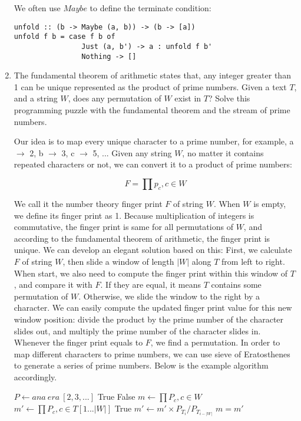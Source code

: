 \documentclass[UTF8]{article}
\begin{document}
\begin{enumerate}
We often use $Maybe$ to define the terminate condition:

\begin{lstlisting}
unfold :: (b -> Maybe (a, b)) -> (b -> [a])
unfold f b = case f b of
                Just (a, b') -> a : unfold f b'
                Nothing -> []
\end{lstlisting}

\item{The fundamental theorem of arithmetic states that, any integer greater than 1 can be unique represented as the product of prime numbers. Given a text $T$, and a string $W$, does any permutation of $W$ exist in $T$? Solve this programming puzzle with the fundamental theorem and the stream of prime numbers.}

Our idea is to map every unique character to a prime number, for example, a $\to$ 2, b $\to$ 3, c $\to$ 5, ... Given any string $W$, no matter it contains repeated characters or not, we can convert it to a product of prime numbers:

\[
F = \prod p_c , c \in W
\]

We call it the number theory finger print $F$ of string $W$. When $W$ is empty, we define its finger print as 1. Because multiplication of integers is commutative, the finger print is same for all permutations of $W$, and according to the fundamental theorem of arithmetic, the finger print is unique. We can develop an elegant solution based on this: First, we calculate $F$ of string $W$, then slide a window of length $|W|$ along $T$ from left to right. When start, we also need to compute the finger print within this window of $T$, and compare it with $F$. If they are equal, it means $T$ contains some permutation of $W$. Otherwise, we slide the window to the right by a character. We can easily compute the updated finger print value for this new window position: divide the product by the prime number of the character slides out, and multiply the prime number of the character slides in. Whenever the finger print equals to $F$, we find a permutation. In order to map different characters to prime numbers, we can use sieve of Eratosthenes to generate a series of prime numbers. Below is the example algorithm accordingly.

\begin{algorithmic}
  \State $P \gets ana \ era \ [2, 3, ...]$ 
    \State \Return True
  \EndIf
    \State \Return False
  \EndIf
  \State $\displaystyle m \gets \prod P_c, c \in W$
  \State $\displaystyle m' \gets \prod P_c, c \in T[1...|W|]$
      \State \Return True
    \EndIf
    \State $m' \gets m' \times P_{T_i} / P_{T_{i - |W|}} $
  \EndFor
  \State \Return $m = m'$
\EndFunction
\end{algorithmic}


\end{enumerate}
\end{document}
